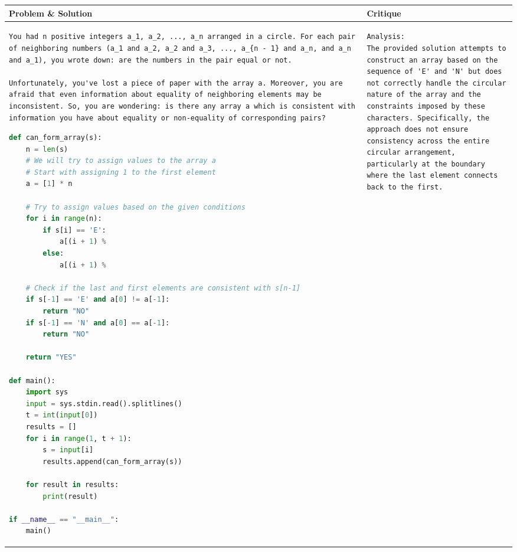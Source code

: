 \begin{table}[]
    \centering
    \small
    \caption{A sample problem from CodeContests~\cite{li2022competition}, with by the solution generated by Qwen2.5-Coder and the critique provided by the {\ours} critic.}
    \label{tab:cc_sample}
\begin{longtable}{m{}m{}}
\toprule
\textbf{Problem \& Solution}  &
\textbf{Critique} \\ 
\midrule
\begin{lstlisting}[frame=none,
    backgroundcolor=\color{white},
    numbers=none,
    xleftmargin=0pt,
    framexleftmargin=0pt,
    framexrightmargin=0pt,
    framextopmargin=0pt,
    framexbottommargin=0pt]
You had n positive integers a_1, a_2, ..., a_n arranged in a circle. For each pair of neighboring numbers (a_1 and a_2, a_2 and a_3, ..., a_{n - 1} and a_n, and a_n and a_1), you wrote down: are the numbers in the pair equal or not.

Unfortunately, you've lost a piece of paper with the array a. Moreover, you are afraid that even information about equality of neighboring elements may be inconsistent. So, you are wondering: is there any array a which is consistent with information you have about equality or non-equality of corresponding pairs?
\end{lstlisting}


\begin{lstlisting}[language=python]
def can_form_array(s):
    n = len(s)
    # We will try to assign values to the array a
    # Start with assigning 1 to the first element
    a = [1] * n
    
    # Try to assign values based on the given conditions
    for i in range(n):
        if s[i] == 'E':
            a[(i + 1) %
        else:
            a[(i + 1) %
    
    # Check if the last and first elements are consistent with s[n-1]
    if s[-1] == 'E' and a[0] != a[-1]:
        return "NO"
    if s[-1] == 'N' and a[0] == a[-1]:
        return "NO"
    
    return "YES"

def main():
    import sys
    input = sys.stdin.read().splitlines()
    t = int(input[0])
    results = []
    for i in range(1, t + 1):
        s = input[i]
        results.append(can_form_array(s))
    
    for result in results:
        print(result)

if __name__ == "__main__":
    main()
\end{lstlisting} 
&
\begin{lstlisting}[frame=none,
    backgroundcolor=\color{white},
    numbers=none,
    xleftmargin=0pt,
    framexleftmargin=0pt,
    framexrightmargin=0pt,
    framextopmargin=0pt,
    framexbottommargin=0pt]
Analysis:
The provided solution attempts to construct an array based on the sequence of 'E' and 'N' but does not correctly handle the circular nature of the array and the constraints imposed by these characters. Specifically, the approach does not ensure consistency across the entire circular arrangement, particularly at the boundary where the last element connects back to the first.


\end{lstlisting}
\end{longtable}
\end{table}
